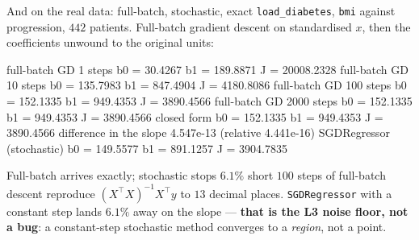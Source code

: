 \documentclass[aspectratio=169]{beamer}
\begin{document}
\begin{frame}[fragile,shrink=6]{And on the real data: full-batch, stochastic, exact}
\texttt{load\_diabetes}, \texttt{bmi} against progression, $442$ patients.
Full-batch gradient descent on standardised $x$, then the coefficients
unwound to the original units:
\begin{outblk}
full-batch GD     1 steps   b0 =   30.4267   b1 =  189.8871   J = 20008.2328
full-batch GD    10 steps   b0 =  135.7983   b1 =  847.4904   J = 4180.8086
full-batch GD   100 steps   b0 =  152.1335   b1 =  949.4353   J = 3890.4566
full-batch GD  2000 steps   b0 =  152.1335   b1 =  949.4353   J = 3890.4566
closed form               b0 =  152.1335   b1 =  949.4353   J = 3890.4566
difference in the slope   4.547e-13 (relative 4.441e-16)
SGDRegressor (stochastic) b0 =  149.5577   b1 =  891.1257   J = 3904.7835
\end{outblk}
\begin{alertblock}{Full-batch arrives exactly; stochastic stops $6.1\%$ short}
  \footnotesize $100$ steps of full-batch descent reproduce
  $(X^{\!\top}\!X)^{-1}X^{\!\top}y$ to $13$ decimal places.
  \texttt{SGDRegressor} with a constant step lands $6.1\%$ away on the slope
  --- \textbf{that is the L3 noise floor, not a bug}: a constant-step
  stochastic method converges to a \emph{region}, not a point.
\end{alertblock}
\end{frame}
\end{document}
